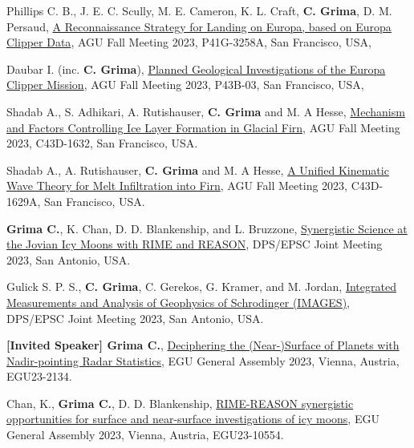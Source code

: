 \begin{etaremune}
\item
    Phillips C. B., J. E. C. Scully, M. E. Cameron, K. L. Craft, \textbf{C. Grima}, D. M. Persaud, \href{https://agu.confex.com/agu/fm23/meetingapp.cgi/Paper/1400206}{A Reconnaissance Strategy for Landing on Europa, based on Europa Clipper Data}, AGU Fall Meeting 2023, P41G-3258A, San Francisco, USA,

\item
    Daubar I. (inc. \textbf{C. Grima}), \href{https://agu.confex.com/agu/fm23/meetingapp.cgi/Paper/1425641}{Planned Geological Investigations of the Europa Clipper Mission}, AGU Fall Meeting 2023, P43B-03, San Francisco, USA,

\item
    Shadab A., S. Adhikari, A. Rutishauser, \textbf{C. Grima} and M. A Hesse,  \href{https://agu.confex.com/agu/fm23/meetingapp.cgi/Paper/1276016}{Mechanism and Factors Controlling Ice Layer Formation in Glacial Firn}, AGU Fall Meeting 2023, C43D-1632, San Francisco, USA.

\item
 Shadab A., A. Rutishauser, \textbf{C. Grima} and M. A Hesse, \href{https://agu.confex.com/agu/fm23/meetingapp.cgi/Paper/1276244}{A Unified Kinematic Wave Theory for Melt Infiltration into Firn}, AGU Fall Meeting 2023, C43D-1629A, San Francisco, USA.

\item
 \textbf{Grima C.}, K. Chan, D. D. Blankenship, and L. Bruzzone, \href{https://submissions.mirasmart.com/DPS55/Itinerary/PresentationDetail.aspx?evdid=804}{Synergistic Science at the Jovian Icy Moons with RIME and REASON}, DPS/EPSC Joint Meeting 2023, San Antonio, USA.

\item
    Gulick S. P. S., \textbf{C. Grima}, C. Gerekos, G. Kramer, and M. Jordan, \href{https://submissions.mirasmart.com/DPS55/Itinerary/PresentationDetail.aspx?evdid=992}{Integrated Measurements and Analysis of Geophysics of Schrodinger (IMAGES)}, DPS/EPSC Joint Meeting 2023, San Antonio, USA.

\item
    \textbf{[Invited Speaker] Grima C.}, \href{https://meetingorganizer.copernicus.org/EGU23/EGU23-2134.html}{Deciphering the (Near-)Surface of Planets with Nadir-pointing Radar Statistics}, EGU General Assembly 2023, Vienna, Austria, EGU23-2134.

\item
    Chan, K., \textbf{Grima C.}, D. D. Blankenship, \href{https://meetingorganizer.copernicus.org/EGU23/EGU23-10554.html}{RIME-REASON synergistic opportunities for surface and near-surface investigations of icy moons}, EGU General Assembly 2023, Vienna, Austria, EGU23-10554.


\end{etaremune}
